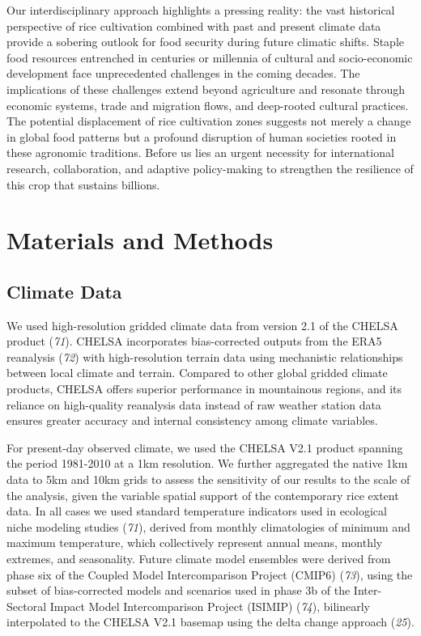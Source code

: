 \documentclass[
  letterpaper,
  DIV=11,
  numbers=noendperiod]{scrartcl}
\begin{document}
Our interdisciplinary approach highlights a pressing reality: the vast
historical perspective of rice cultivation combined with past and
present climate data provide a sobering outlook for food security during
future climatic shifts. Staple food resources entrenched in centuries or
millennia of cultural and socio-economic development face unprecedented
challenges in the coming decades. The implications of these challenges
extend beyond agriculture and resonate through economic systems, trade
and migration flows, and deep-rooted cultural practices. The potential
displacement of rice cultivation zones suggests not merely a change in
global food patterns but a profound disruption of human societies rooted
in these agronomic traditions. Before us lies an urgent necessity for
international research, collaboration, and adaptive policy-making to
strengthen the resilience of this crop that sustains billions.

\section{Materials and Methods}\label{materials-and-methods}

\subsection{Climate Data}\label{climate-data}

We used high-resolution gridded climate data from version 2.1 of the
CHELSA product (\emph{71}). CHELSA incorporates bias-corrected outputs
from the ERA5 reanalysis (\emph{72}) with high-resolution terrain data
using mechanistic relationships between local climate and terrain.
Compared to other global gridded climate products, CHELSA offers
superior performance in mountainous regions, and its reliance on
high-quality reanalysis data instead of raw weather station data ensures
greater accuracy and internal consistency among climate variables.

For present-day observed climate, we used the CHELSA V2.1 product
spanning the period 1981-2010 at a 1km resolution. We further aggregated
the native 1km data to 5km and 10km grids to assess the sensitivity of
our results to the scale of the analysis, given the variable spatial
support of the contemporary rice extent data. In all cases we used
standard temperature indicators used in ecological niche modeling
studies (\emph{71}), derived from monthly climatologies of minimum and
maximum temperature, which collectively represent annual means, monthly
extremes, and seasonality. Future climate model ensembles were derived
from phase six of the Coupled Model Intercomparison Project (CMIP6)
(\emph{73}), using the subset of bias-corrected models and scenarios
used in phase 3b of the Inter-Sectoral Impact Model Intercomparison
Project (ISIMIP) (\emph{74}), bilinearly interpolated to the CHELSA V2.1
basemap using the delta change approach (\emph{25}).
\end{document}
